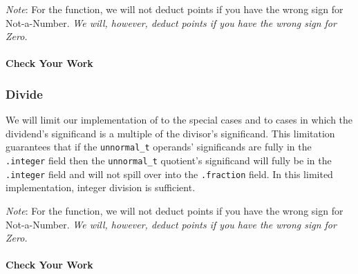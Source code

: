 \textit{Note}: For the  function, we will not deduct points if you have the wrong sign for Not-a-Number.
\textit{We will, however, deduct points if you have the wrong sign for Zero.}

\paragraph*{Check Your Work}

\begin{description}
\end{description}


\subsubsection{Divide}

We will limit our implementation of  to the special cases and to cases in which the dividend's significand is a multiple of the divisor's significand.
This limitation guarantees that if the \lstinline{unnormal_t} operands' significands are fully in the \lstinline{.integer} field then the \lstinline{unnormal_t} quotient's significand will fully be in the \lstinline{.integer} field and will not spill over into the \lstinline{.fraction} field.
In this limited implementation, integer division is sufficient.

\begin{description}
\end{description}

\textit{Note}: For the  function, we will not deduct points if you have the wrong sign for Not-a-Number.
\textit{We will, however, deduct points if you have the wrong sign for Zero.}

\paragraph*{Check Your Work}

\begin{description}
\end{description}



